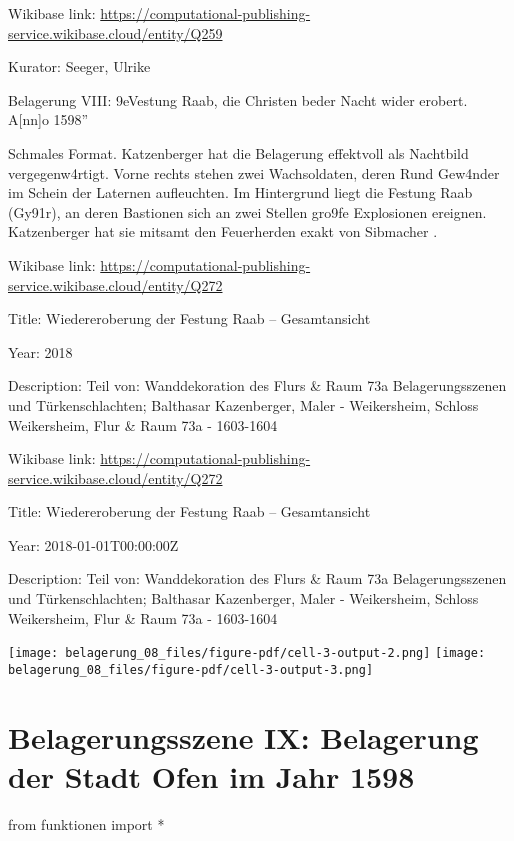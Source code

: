 \documentclass[
  a4paper,
  portrait]{book}
\newenvironment{Shaded}{\begin{snugshade}}{\end{snugshade}}
\newcommand{\ImportTok}[1]{\textcolor[rgb]{0.00,0.46,0.62}{#1}}
\newcommand{\NormalTok}[1]{\textcolor[rgb]{0.00,0.23,0.31}{#1}}
\newcommand{\OperatorTok}[1]{\textcolor[rgb]{0.37,0.37,0.37}{#1}}
\begin{document}
Wikibase link:
\url{https://computational-publishing-service.wikibase.cloud/entity/Q259}

Kurator: Seeger, Ulrike

Belagerung VIII: \x9eVestung Raab, die Christen be\xbf der
Nacht wider erobert. A{[}nn{]}o 1598''

Schmales Format. Katzenberger hat die Belagerung effektvoll als
Nachtbild vergegenw\xa4rtigt. Vorne rechts stehen zwei Wachsoldaten,
deren R\xbcstungen und Gew\xa4nder im Schein der Laternen
aufleuchten. Im Hintergrund liegt die Festung Raab (Gy\x91r), an
deren Bastionen sich an zwei Stellen gro\x9fe Explosionen ereignen.
Katzenberger hat sie mitsamt den Feuerherden exakt von Sibmacher
\xbcbernommen.

Wikibase link:
\url{https://computational-publishing-service.wikibase.cloud/entity/Q272}

Title: Wiedereroberung der Festung Raab -- Gesamtansicht

Year: 2018

Description: Teil von: Wanddekoration des Flurs \& Raum 73a
Belagerungsszenen und Türkenschlachten; Balthasar Kazenberger, Maler -
Weikersheim, Schloss Weikersheim, Flur \& Raum 73a - 1603-1604

Wikibase link:
\url{https://computational-publishing-service.wikibase.cloud/entity/Q272}

Title: Wiedereroberung der Festung Raab -- Gesamtansicht

Year: 2018-01-01T00:00:00Z

Description: Teil von: Wanddekoration des Flurs \& Raum 73a
Belagerungsszenen und Türkenschlachten; Balthasar Kazenberger, Maler -
Weikersheim, Schloss Weikersheim, Flur \& Raum 73a - 1603-1604

\texttt{[image: belagerung\_08\_files/figure-pdf/cell-3-output-2.png]}
\texttt{[image: belagerung\_08\_files/figure-pdf/cell-3-output-3.png]}

\chapter{Belagerungsszene IX: Belagerung der Stadt Ofen im Jahr
1598}\label{belagerungsszene-ix-belagerung-der-stadt-ofen-im-jahr-1598}

\begin{Shaded}
\begin{Highlighting}[]
\ImportTok{from}\NormalTok{ funktionen }\ImportTok{import} \OperatorTok{*}
\end{Highlighting}
\end{Shaded}
\end{document}
